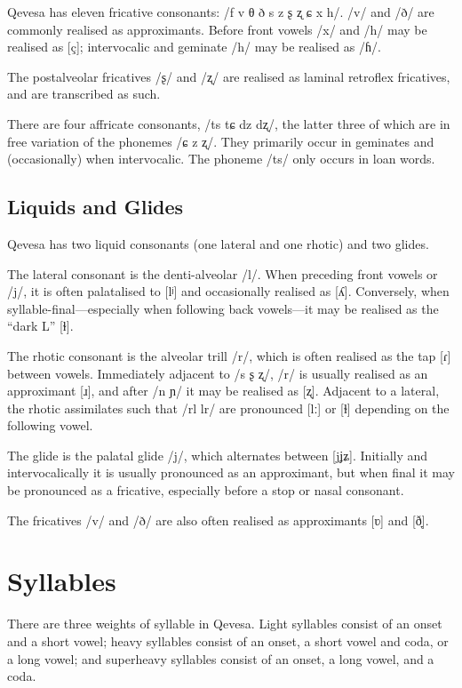 \documentclass[grammar]{subfiles}
\begin{document}
Qevesa has eleven fricative consonants: /f v θ ð s z ʂ ʐ ɕ x h/.  /v/ and /ð/ are
commonly realised as approximants.  Before front vowels /x/ and /h/ may be realised
as [ç]; intervocalic and geminate /h/ may be realised as /ɦ/. 

The postalveolar fricatives /ʂ/ and /ʐ/ are realised as laminal retroflex
fricatives, and are transcribed as such.

There are four affricate consonants, /ts tɕ dz dʐ/, the latter three of which
are in free variation of the phonemes /ɕ z ʐ/.  They primarily occur in
geminates and (occasionally) when intervocalic.  The phoneme /ts/ only occurs
in loan words.


\subsection{Liquids and Glides}
\label{ssec:liquids}

Qevesa has two liquid consonants (one lateral and one rhotic) and two glides.

The lateral consonant is the denti-alveolar /l/.  When preceding front vowels
or /j/, it is often palatalised to [lʲ] and occasionally realised as [ʎ].
Conversely, when syllable-final—especially when following back vowels—it may be
realised as the “dark L” [ɫ].

The rhotic consonant is the alveolar trill /r/, which is often realised as the
tap [ɾ] between vowels.  Immediately adjacent to /s ʂ ʐ/, /r/ is usually
realised as an approximant [ɹ], and after /n ɲ/ it may be realised as [ʐ].
Adjacent to a lateral, the rhotic assimilates such that /rl lr/ are pronounced
[lː] or [ɫ] depending on the following vowel.

The glide is the palatal glide /j/, which alternates between [j\tlde ʝ\tlde ʑ].
Initially and intervocalically it is usually pronounced as an approximant, but
when final it may be pronounced as a fricative, especially before a stop or
nasal consonant.  

The fricatives /v/ and /ð/ are also often realised as approximants [ʋ] and [ð̞].  


\section{Syllables}
\label{sec:syllables}

There are three weights of syllable in Qevesa.  Light syllables consist of an
onset and a short vowel; heavy syllables consist of an onset, a short vowel and
coda, or a long vowel; and superheavy syllables consist of an onset, a long
vowel, and a coda. 
\end{document}
